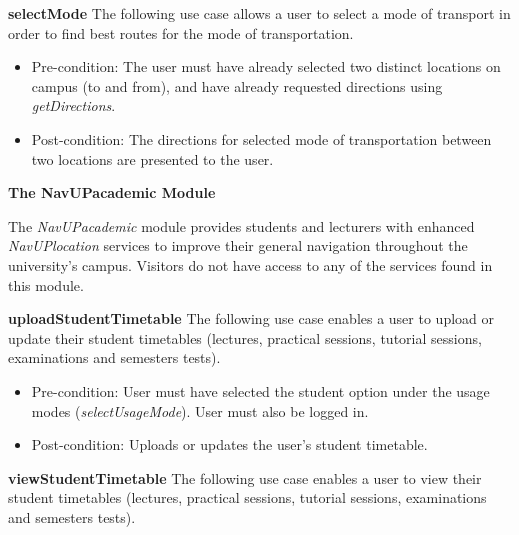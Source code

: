 \documentclass[12pt,a4paper]{article}
\begin{document}

			\textbf{selectMode}
			The following use case allows a user to select a mode of transport in order to find best routes for the mode of 		        transportation.

			\begin{itemize}
			\item Pre-condition: The user must have already selected two distinct locations on campus (to and from), and have 					  already requested directions using \textit{getDirections}.
			\item Post-condition: The directions for selected mode of transportation between two locations are presented to     				  the user.
			\end{itemize}

	    \textbf{The NavUPacademic Module} \newline

	    The \textit{NavUPacademic} module provides students and lecturers with enhanced \textit{NavUPlocation} services to 				improve their general navigation throughout the university's campus. Visitors do not have access to any of the 				    services found in this module.

	    \medskip

	    \textbf{uploadStudentTimetable}
		The following use case enables a user to upload or update their student timetables (lectures, practical sessions, 			    tutorial sessions, examinations and semesters tests).

		\begin{itemize}
		  \item Pre-condition: User must have selected the student option under the usage modes (\textit{selectUsageMode}). 					User must also be logged in.
		   \item Post-condition: Uploads or updates the user's student timetable.
		\end{itemize}

	    \textbf{viewStudentTimetable}
		The following use case enables a user to view their student timetables (lectures, practical sessions, tutorial        			sessions, examinations and semesters tests).


\end{document}
\end{itemize}
\end{document}
